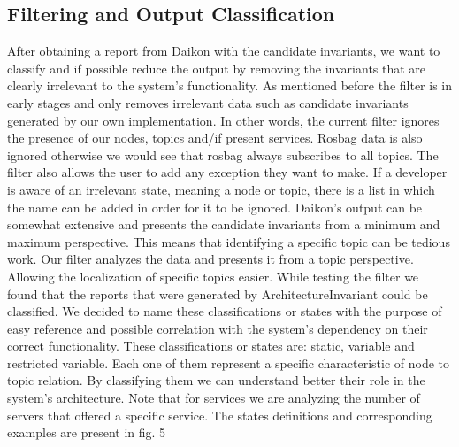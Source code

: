 \documentclass[10pt, conference]{IEEEtran}
\begin{document}
\subsection{Filtering and Output Classification}
After obtaining a report from Daikon with the candidate invariants, we want to classify and if possible reduce the output by removing the invariants that are clearly irrelevant to the system's functionality. As mentioned before the filter is in early stages and only removes irrelevant data such as candidate invariants generated by our own implementation.  In other words, the current filter ignores the presence of our nodes, topics and/if present services. Rosbag data is also ignored otherwise we would see that rosbag always subscribes to all topics. 
\newline \indent The filter also allows the user to add any exception they want to make. If a developer is aware of an irrelevant state, meaning a node or topic, there is a list in which the name can be added in order for it to be ignored. 
\newline \indent Daikon's output can be somewhat extensive and presents the candidate invariants from a minimum and maximum perspective. This means that identifying a specific topic can be tedious work. Our filter analyzes the data and presents it from a topic perspective. Allowing the localization of specific topics easier.  
While testing the filter we found that the reports that were generated by ArchitectureInvariant could be classified. We decided to name these classifications or states with the purpose of easy reference and possible correlation with the system's dependency on their correct functionality. These classifications or states are: static, variable and restricted variable. Each one of them represent a specific characteristic of node to topic relation. By classifying them we can understand better their role in the system's architecture. Note that for services we are analyzing the number of servers that offered a specific service. The states definitions and corresponding examples are present in fig. 5 
\end{document}
